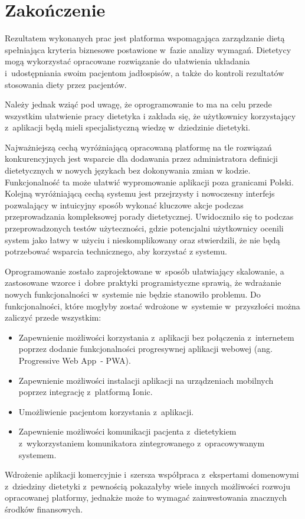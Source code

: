 \chapter*{Zakończenie}\label{ch:ending}
Rezultatem wykonanych prac jest platforma wspomagająca zarządzanie dietą spełniająca kryteria biznesowe postawione w~fazie analizy wymagań.
Dietetycy mogą wykorzystać opracowane rozwiązanie do ułatwienia układania i~udostępniania swoim pacjentom jadłospisów,
a także do kontroli rezultatów stosowania diety przez pacjentów.

\par
Należy jednak wziąć pod uwagę, że oprogramowanie to ma na celu przede wszystkim ułatwienie pracy dietetyka
i zakłada się, że użytkownicy korzystający z~aplikacji będą mieli specjalistyczną wiedzę w~dziedzinie dietetyki.

\par
Najważniejszą cechą wyróżniającą opracowaną platformę na tle rozwiązań konkurencyjnych
jest wsparcie dla dodawania przez administratora definicji dietetycznych w nowych językach bez dokonywania zmian w kodzie.
Funkcjonalność ta może ułatwić wypromowanie aplikacji poza granicami Polski.
Kolejną wyróżniającą cechą systemu jest przejrzysty i nowoczesny interfejs pozwalający w intuicyjny sposób wykonać kluczowe akcje podczas przeprowadzania kompleksowej porady dietetycznej.
Uwidoczniło się to podczas przeprowadzonych testów użyteczności, gdzie potencjalni użytkownicy ocenili system jako łatwy w użyciu i nieskomplikowany
oraz stwierdzili, że nie będą potrzebować wsparcia technicznego, aby korzystać z systemu.

\par
Oprogramowanie zostało zaprojektowane w~sposób ułatwiający skalowanie,
a zastosowane wzorce i~dobre praktyki programistyczne sprawią, że wdrażanie nowych funkcjonalności w~systemie nie będzie stanowiło problemu.
Do funkcjonalności, które mogłyby zostać wdrożone w~systemie w~przyszłości można zaliczyć przede wszystkim:
\begin{itemize}
    \item Zapewnienie możliwości korzystania z~aplikacji bez połączenia z~internetem poprzez dodanie funkcjonalności progresywnej aplikacji webowej (ang. Progressive Web App~- PWA)\cite{url:pwa}.
    \item Zapewnienie możliwości instalacji aplikacji na urządzeniach mobilnych poprzez integrację z~platformą Ionic\cite{tech:ionic}.
    \item Umożliwienie pacjentom korzystania z~aplikacji.
    \item Zapewnienie możliwości komunikacji pacjenta z~dietetykiem z~wykorzystaniem komunikatora zintegrowanego z~opracowywanym systemem.
\end{itemize}

\par
Wdrożenie aplikacji komercyjnie i~szersza współpraca z~ekspertami domenowymi z~dziedziny dietetyki z~pewnością pokazałyby wiele innych możliwości rozwoju opracowanej platformy,
jednakże może to wymagać zainwestowania znacznych środków finansowych.
\thispagestyle{normal}
